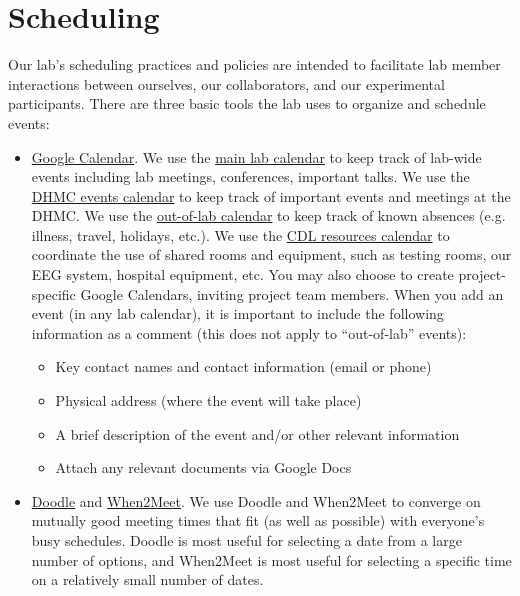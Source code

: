 \documentclass{tufte-book} %
\begin{document}
\section{Scheduling}
Our lab's scheduling practices and policies are intended to facilitate
lab member interactions between ourselves, our collaborators, and our
experimental participants.  There are three basic tools the lab uses
to organize and schedule events:
\begin{itemize}
\item \href{http://calendar.google.com}{Google Calendar}.  We use the
  \href{https://calendar.google.com/calendar/ical/5ta50cfv4uih0a0k8m2di9dhjo\%40group.calendar.google.com/private-ff1338ddce84ac37d5ab682cd94e7f69/basic.ics}{main lab calendar} to keep track of lab-wide events including lab
  meetings, conferences, important talks.  We use the \href{https://calendar.google.com/calendar/ical/j6noo2tqahpsoq9na1h16paf3s\%40group.calendar.google.com/private-c3d75bea1ab4605947353d159d3dcd05/basic.ics}{DHMC events
  calendar} to keep track of important events and meetings at the
  DHMC.  We use the \href{https://calendar.google.com/calendar/ical/h1j06dohcg7v1g2o5tkb7ijhvs\%40group.calendar.google.com/private-239aaf8b4dc60480c90e8d7fc353e229/basic.ics}{out-of-lab calendar} to keep track of known
  absences (e.g. illness, travel, holidays,
  etc.).  We use the
  \href{https://calendar.google.com/calendar/ical/dgcv8l8a8s10hfg2s5h0qec0q0\%40group.calendar.google.com/private-4810aed94f818d5748045447ab46c62d/basic.ics}{CDL
    resources calendar} to coordinate the use of shared rooms and
  equipment, such as testing rooms, our EEG system, hospital
  equipment, etc.  You may also choose to create project-specific
  Google Calendars, inviting project team members.  When you add an
  event (in any lab calendar), it is important to include
  the following information as a comment (this does not apply to ``out-of-lab'' events):
\begin{itemize}
  \item Key contact names and contact information (email or phone)
  \item Physical address (where the event will take place)
  \item A brief description of the event and/or other relevant information
  \item Attach any relevant documents via Google Docs
\end{itemize}
\item \href{http://www.doodle.com}{Doodle} and
  \href{http://www.when2meet.com}{When2Meet}.  We use Doodle and
  When2Meet to converge on mutually good meeting times that fit (as
  well as possible) with everyone's busy schedules.  Doodle is most
  useful for selecting a date from a large number of options, and
  When2Meet is most useful for selecting a specific time on a
  relatively small number of dates.
\end{itemize}
\end{document}
